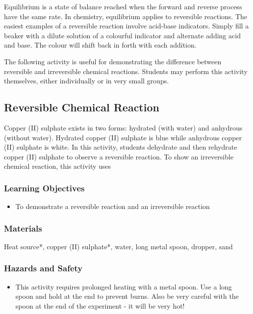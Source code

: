 Equilibrium is a state of balance reached when the forward and reverse process have the same rate. In chemistry, equilibrium applies to reversible reactions. The easiest examples of a reversible reaction involve acid-base indicators. Simply fill a beaker with a dilute solution of a colourful indicator and alternate adding acid and base. The colour will shift back in forth with each addition.

The following activity is useful for demonstrating the difference between reversible and irreversible chemical reactions. Students may perform this activity themselves, either individually or in very small groups.

\subsection{Reversible Chemical Reaction}

Copper (II) sulphate exists in two forms: hydrated (with water) and anhydrous (without water). Hydrated copper (II) sulphate is blue while anhydrous copper (II) sulphate is white. In this activity, students dehydrate and then rehydrate copper (II) sulphate to observe a reversible reaction. To show an irreversible chemical reaction, this activity uses 

\subsubsection*{Learning Objectives}
\begin{itemize}
\item{To demonstrate a reversible reaction and an irreversible reaction}
\end{itemize}

\subsubsection*{Materials}
Heat source*, copper (II) sulphate*, water, long metal spoon, dropper, sand

\subsubsection*{Hazards and Safety}
\begin{itemize}
\item{This activity requires prolonged heating with a metal spoon. Use a long spoon and hold at the end to prevent burns. Also be very careful with the spoon at the end of the experiment - it will be very hot!}
\end{itemize}

